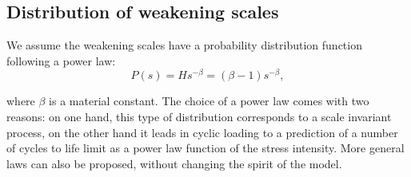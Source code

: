 \documentclass[3p,times,procedia,number]{elsarticle}
\begin{document}
\vspace{6pt}

\subsection{Distribution of weakening scales}

We assume the weakening scales have a  probability distribution function following a power law:
\begin{equation}
P(s) = Hs^{-\beta}=(\beta-1)s^{-\beta},
\label{eq.ps}
\end{equation}

where $\beta$ is a material constant. 
The choice of a power law comes with two reasons: on one hand, this type of distribution corresponds to a scale invariant process, on the other hand it leads in cyclic loading to a prediction of a number of cycles to life limit as a power law function of the stress intensity. More general laws can also be proposed, without changing the spirit of the model.
\end{document}
